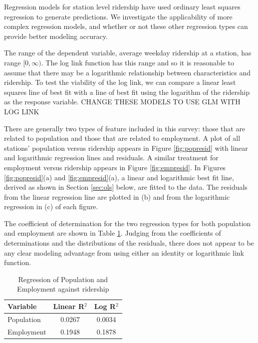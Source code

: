 \documentclass[11pt]{article}
\begin{document}
Regression models for station level ridership have used ordinary least squares regression \cite{Kuby2004, Taylor2008, Currie2011, Durning2015, Gutierrez2011} to generate predictions. We investigate the applicability of more complex regression models, and whether or not these other regression types can provide better modeling accuracy.

The range of the dependent variable, average weekday ridership at a station, has range $[0, \infty)$. The log link function has this range and so it is reasonable to assume that there may be a logarithmic relationship between characteristics and ridership. To test the viability of the log link, we can compare a linear least squares line of best fit with a line of best fit using the logarithm of the ridership as the response variable. CHANGE THESE MODELS TO USE GLM WITH LOG LINK

There are generally two types of feature included in this survey: those that are related to population and those that are related to employment. A plot of all stations' population versus ridership appears in Figure \ref{fig:popresid} with linear and logarithmic regression lines and residuals. A similar treatment for employment versus ridership appears in Figure \ref{fig:empresid}. In Figures  \ref{fig:popresid}(a) and \ref{fig:empresid}(a), a linear and logarithmic best fit line, derived as shown in Section \ref{sec:ols} below, are fitted to the data. The residuals from the linear regression line are plotted in (b) and from the logarithmic regression in (c) of each figure. 

The coefficient of determination for the two regression types for both population and employment are shown in Table \ref{tab:regr2}. Judging from the coefficients of determinations and the distributions of the residuals, there does not appear to be any clear modeling advantage from using either an identity or logarithmic link function. 

\begin{table}[H]
\centering
\begin{tabular}{lcc}
\toprule Variable&Linear R$^2$&Log R$^2$ \\ 
\midrule Population&0.0267&0.0034 \\
Employment&0.1948&0.1878 \\
\bottomrule
\end{tabular}
\caption{Regression of Population and Employment against ridership}\label{tab:regr2}
\end{table}
\end{document}

